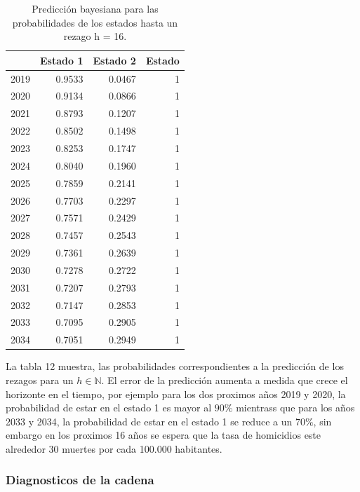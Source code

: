 \documentclass[a4paper]{article}\usepackage[]{graphicx}\usepackage[]{color}
\begin{document}
\begin{table}[ht]
\centering
\begin{tabular}{rrrr}
  \hline
 & Estado 1 & Estado 2 & Estado \\ 
  \hline
2019 & 0.9533 & 0.0467 &     1 \\ 
  2020 & 0.9134 & 0.0866 &     1 \\ 
  2021 & 0.8793 & 0.1207 &     1 \\ 
  2022 & 0.8502 & 0.1498 &     1 \\ 
  2023 & 0.8253 & 0.1747 &     1 \\ 
  2024 & 0.8040 & 0.1960 &     1 \\ 
  2025 & 0.7859 & 0.2141 &     1 \\ 
  2026 & 0.7703 & 0.2297 &     1 \\ 
  2027 & 0.7571 & 0.2429 &     1 \\ 
  2028 & 0.7457 & 0.2543 &     1 \\ 
  2029 & 0.7361 & 0.2639 &     1 \\ 
  2030 & 0.7278 & 0.2722 &     1 \\ 
  2031 & 0.7207 & 0.2793 &     1 \\ 
  2032 & 0.7147 & 0.2853 &     1 \\ 
  2033 & 0.7095 & 0.2905 &     1 \\ 
  2034 & 0.7051 & 0.2949 &     1 \\ 
   \hline
\end{tabular}
\caption{Predicción bayesiana para las probabilidades de los estados hasta un rezago h = 16.} 
\end{table}


La tabla 12 muestra, las probabilidades correspondientes a la predicción de los rezagos para un $h \in \mathbb{N}$. El error de la predicción aumenta a medida que crece el horizonte en el tiempo, por ejemplo para los dos proximos años 2019 y 2020, la probabilidad de estar en el estado 1 es mayor al $90 \%$ mientrass que para los años 2033 y 2034, la probabilidad de estar en el estado 1 se reduce a un $70 \%$, sin embargo en los proximos 16 años se espera que la tasa de homicidios este alrededor 30 muertes por cada 100.000 habitantes.

\subsubsection*{Diagnosticos de la cadena}
\end{document}
